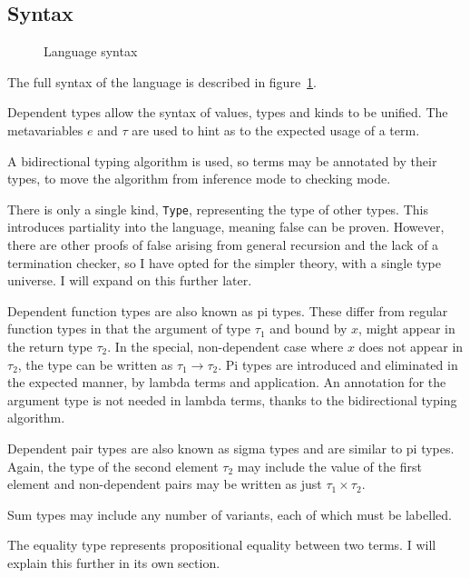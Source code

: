 \documentclass[12pt,a4paper,twoside]{report}
\begin{document}
\subsection{Syntax}

\begin{figure}
    \syntax{}
    \caption{Language syntax}
    \label{syntax}
\end{figure}


The full syntax of the language is described in figure~\ref{syntax}.

Dependent types allow the syntax of values, types and kinds to be unified.
The metavariables \(e\) and \(\tau\) are used to hint as to the expected usage of a term.

A bidirectional typing algorithm is used, so terms may be annotated by their types, to move the algorithm from inference mode to checking mode.

There is only a single kind, \lstinline{Type}, representing the type of other types.
This introduces partiality into the language, meaning false can be proven.
However, there are other proofs of false arising from general recursion and the lack of a termination checker, so I have opted for the simpler theory, with a single type universe.
I will expand on this further later.


Dependent function types are also known as pi types. These differ from regular function types in that the argument of type \(\tau_1\) and bound by \(x\), might appear in the return type \(\tau_2\). In the special, non-dependent case where \(x\) does not appear in \(\tau_2\), the type can be written as \(\tau_1 \rightarrow \tau_2\). Pi types are introduced and eliminated in the expected manner, by lambda terms and application. An annotation for the argument type is not needed in lambda terms, thanks to the bidirectional typing algorithm.

Dependent pair types are also known as sigma types and are similar to pi types.
Again, the type of the second element \(\tau_2\) may include the value of the first element and non-dependent pairs may be written as just \(\tau_1 \times \tau_2\).

Sum types may include any number of variants, each of which must be labelled.

The equality type represents propositional equality between two terms.
I will explain this further in its own section. 
\end{document}
